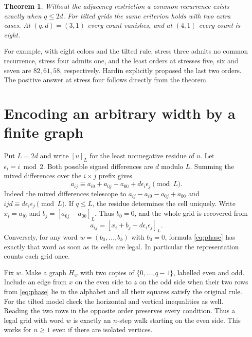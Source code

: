 \documentclass[11pt,letterpaper]{article}
\newtheorem{theorem}{Theorem}[section]
\begin{document}
\begin{theorem}\label{th:threshold}
Without the adjacency restriction a common recurrence exists exactly when $q\le 2d$.
For tilted grids the same criterion holds with two extra cases. At $(q,d)=(3,1)$ every count vanishes, and at $(4,1)$ every count is eight.
\end{theorem}

For example, with eight colors and the tilted rule, stress three admits no common recurrence, stress four admits one, and the least orders at stresses five, six and seven are $82,61,58$, respectively. Hardin explicitly proposed the last two orders. The positive answer at stress four follows directly from the theorem.

\clearpage
\section{Encoding an arbitrary width by a finite graph}\label{sec:graph}

Put $L=2d$ and write $[u]_L$ for the least nonnegative residue of $u$. Let $\epsilon_i=i\bmod2$. Both possible signed differences are $d$ modulo $L$. Summing the mixed differences over the $i\times j$ prefix gives
\[
 a_{ij}\equiv a_{i0}+a_{0j}-a_{00}+d\epsilon_i\epsilon_j\pmod L.
\]
Indeed the mixed differences telescope to $a_{ij}-a_{i0}-a_{0j}+a_{00}$ and $ijd\equiv d\epsilon_i\epsilon_j\pmod L$. If $q\le L$, the residue determines the cell uniquely. Write $x_i=a_{i0}$ and $b_j=[a_{0j}-a_{00}]_L$. Thus $b_0=0$, and the whole grid is recovered from
\begin{equation}\label{eq:phase}
 a_{ij}=[x_i+b_j+d\epsilon_i\epsilon_j]_L .
\end{equation}
Conversely, for any word $w=(b_0,\ldots,b_k)$ with $b_0=0$, formula \eqref{eq:phase} has exactly that word as soon as its cells are legal. In particular the representation counts each grid once.

Fix $w$. Make a graph $H_w$ with two copies of $\{0,\ldots,q-1\}$, labelled even and odd. Include an edge from $x$ on the even side to $z$ on the odd side when their two rows from \eqref{eq:phase} lie in the alphabet and all their squares satisfy the original rule. For the tilted model check the horizontal and vertical inequalities as well. Reading the two rows in the opposite order preserves every condition. Thus a legal grid with word $w$ is exactly an $n$-step walk starting on the even side. This works for $n\ge1$ even if there are isolated vertices.
\end{document}
